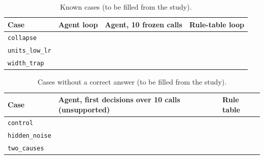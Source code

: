 \documentclass[11pt]{article}
\begin{document}
\begin{table}[!htb]\centering\small
\caption{Known cases (to be filled from the study).}\label{tab:known}
\begin{tabular}{@{}llll@{}}\toprule
Case & Agent loop & Agent, 10 frozen calls & Rule-table loop\\\midrule
\texttt{collapse} & & & \\
\texttt{units\_low\_lr} & & & \\
\texttt{width\_trap} & & & \\\bottomrule
\end{tabular}
\end{table}

\begin{table}[!htb]\centering\small
\caption{Cases without a correct answer (to be filled from the study).}\label{tab:ambiguous}
\begin{tabular}{@{}lll@{}}\toprule
Case & Agent, first decisions over 10 calls (unsupported) & Rule table\\\midrule
\texttt{control} & & \\
\texttt{hidden\_noise} & & \\
\texttt{two\_causes} & & \\\bottomrule
\end{tabular}
\end{table}
\end{document}
